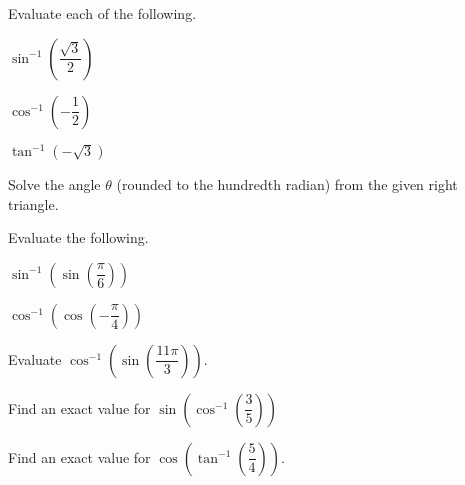 \begin{exercise}
  Evaluate each of the following.\\
  \begin{enumerate*}
      \item ${\sin}^{-1}\left(\dfrac{\sqrt{3}}{2}\right)$
      \item ${\cos}^{-1}\left(-\dfrac{1}{2}\right)$
      \item ${\tan}^{-1}(-\sqrt{3})$\hfill\null
  \end{enumerate*}
  \end{exercise}
  
  \begin{exercise}
    Solve the angle $\theta$ (rounded to the hundredth radian) from the given right triangle.
  
  \end{exercise}
 

  \begin{exercise}
    Evaluate the following.\\
    \begin{enumerate*}
      \item ${\sin}^{-1}\left(\sin \left(\dfrac{\pi}{6}\right)\right)$
      \item ${\cos}^{-1}\left(\cos \left(-\dfrac{\pi}{4}\right)\right)$\hfill\null
    \end{enumerate*}
  \end{exercise}

   
  \newpage
  
  \begin{exercise}
    Evaluate $\cos^{-1}\left(\sin\left(\dfrac{11\pi}{3}\right)\right)$.
  \end{exercise}
  
  \begin{exercise}
    Find an exact value for $\sin\left({\cos}^{-1}\left(\dfrac{3}{5}\right)\right)$
  \end{exercise}
  
  \begin{exercise}
    Find an exact value for $\cos\left({\tan}^{-1}\left(\dfrac{5}{4}\right)\right)$.
  \end{exercise}
  